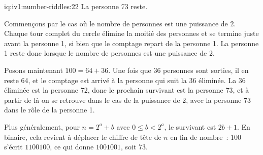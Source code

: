 \enlargethispage{-3\baselineskip}%
\begin{solution}{iq:iv1:number-riddles:22}
La personne 73 reste.

Commençons par le cas où le nombre de personnes est une puissance de 2. Chaque tour complet du cercle élimine la moitié des personnes et se termine juste avant la personne 1, si bien que le comptage repart de la personne 1. La personne 1 reste donc lorsque le nombre de personnes est une puissance de 2.

Posons maintenant $100 = 64 + 36$. Une fois que 36 personnes sont sorties, il en reste 64, et le comptage est arrivé à la personne qui suit la 36 éliminée. La 36 éliminée est la personne 72, donc le prochain survivant est la personne 73, et à partir de là on se retrouve dans le cas de la puissance de 2, avec la personne 73 dans le rôle de la personne 1.

Plus généralement, pour $n = 2^a + b$ avec $0 \le b < 2^a$, le survivant est $2b + 1$. En binaire, cela revient à déplacer le chiffre de tête de $n$ en fin de nombre~: $100$ s'écrit $1100100$, ce qui donne $1001001$, soit 73.

\end{solution}

